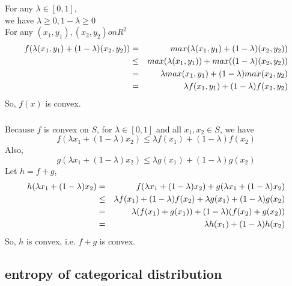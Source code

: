 \documentclass[english,11pt]{article}
\begin{document}
\subsubsection{}
For any $ \lambda\in[0,1] $,\\
we have $ \lambda \geq 0,  1 - \lambda \geq 0$ \\
For any $(x_{1}, y_{1}), (x_{2}, y_{2}) on R^{2}$
\begin{eqnarray}
f(\lambda(x_{1}, y_{1}) + (1-\lambda)(x_{2}, y_{2})) & = & max(\lambda(x_{1}, y_{1}) + (1-\lambda)(x_{2}, y_{2})) \notag \\
& \leq & max(\lambda(x_{1}, y_{1})) + max((1-\lambda)(x_{2}, y_{2})) \notag \\
& = & \lambda max(x_{1},y_{1}) + (1- \lambda)max(x_{2}, y_{2}) \notag \\
& = & \lambda f(x_{1}, y_{1}) + (1-\lambda)f(x_{2}, y_{2}) 
\end{eqnarray}
So, $f(x)$ is convex.
\subsubsection{}
Because $f$ is convex on $S$, for $\lambda \in [0,1]$ and all $x_{1}, x_{2} \in S$, we have \\
\begin{equation}
f(\lambda x_{1} + (1-\lambda) x_{2}) \leq \lambda f(x_{1}) + (1 - \lambda)f(x_{2}) 
\end{equation}
Also, \\ 
\begin{equation}
g(\lambda x_{1} + (1-\lambda) x_{2}) \leq \lambda g(x_{1}) + (1 - \lambda)g(x_{2})
\end{equation}
Let $h = f + g$,
\begin{eqnarray}
h(\lambda x_{1} + (1-\lambda) x_{2}) & = & f(\lambda x_{1} + (1-\lambda) x_{2}) +  g(\lambda x_{1} + (1-\lambda) x_{2}) \notag \\
& \leq & \lambda f(x_{1}) + (1 - \lambda)f(x_{2}) + \lambda g(x_{1}) + (1 - \lambda)g(x_{2}) \notag \\
& = & \lambda (f(x_{1}) + g(x_{1})) + (1 - \lambda)(f(x_{2}) + g(x_{2}))\notag \\
& = & \lambda h(x_{1}) + (1-\lambda)h(x_{2})
\end{eqnarray}
So, $h$ is convex, i.e. $f+g$ is convex.
\subsubsection{}

\subsection{entropy of categorical distribution}
\end{document}
